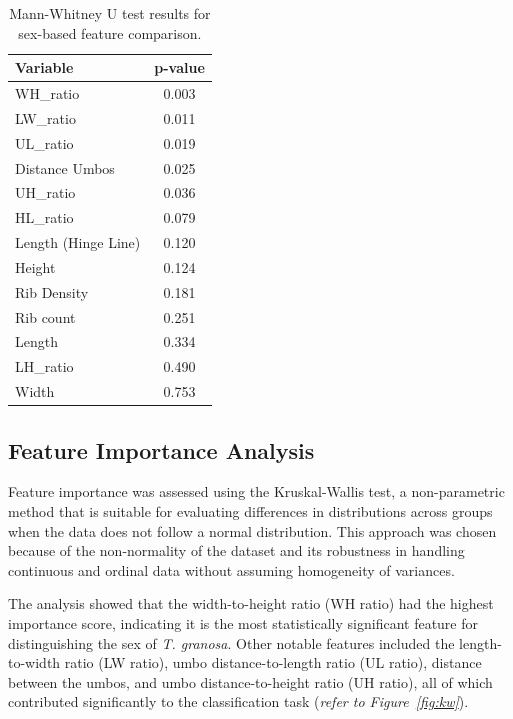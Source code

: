\vspace{0.5cm}
\begin{table}[H]
	\centering
	\small %
	\begin{tabular}{lc}
		\hline
		\textbf{Variable} & \textbf{p-value} \\ \hline
		WH\_ratio & 0.003 \\
		LW\_ratio & 0.011 \\
		UL\_ratio & 0.019 \\
		Distance Umbos & 0.025 \\
		UH\_ratio & 0.036 \\
		HL\_ratio & 0.079 \\
		Length (Hinge Line) & 0.120 \\
		Height & 0.124 \\
		Rib Density & 0.181 \\
		Rib count & 0.251 \\
		Length & 0.334 \\
		LH\_ratio & 0.490 \\
		Width & 0.753 \\ \hline
		
	\end{tabular}
	
	\caption{Mann-Whitney U test results for sex-based feature comparison.}
	\label{tab:mann-whitney}
\end{table}

\newpage
\subsection{Feature Importance Analysis}

Feature importance was assessed using the Kruskal-Wallis test, a non-parametric method that is suitable for evaluating differences in distributions across groups when the data does not follow a normal distribution. This approach was chosen because of the non-normality of the dataset and its robustness in handling continuous and ordinal data without assuming homogeneity of variances. \cite{ribeiro2024}

The analysis showed that the width-to-height ratio (WH ratio) had the highest importance score, indicating it is the most statistically significant feature for distinguishing the sex of \textit{T. granosa}. Other notable features included the length-to-width ratio (LW ratio), umbo distance-to-length ratio (UL ratio), distance between the umbos, and umbo distance-to-height ratio (UH ratio), all of which contributed significantly to the classification task (\textit{refer to Figure~\ref{fig:kw}}).

